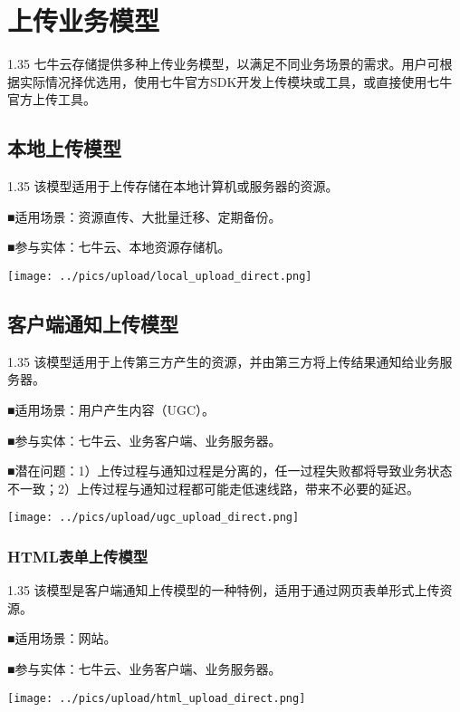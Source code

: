 \documentclass[11pt, oneside]{book}
\newcommand{\qpara}[1]{
\vspace{0.2em}
\begin{spacing}{1.35}
\noindent
#1\par
\end{spacing}
\vspace{0.2em}
}
\newcommand{\qblock}[1]{
\vspace{0.1em}
\noindent
#1\par
\vspace{0.1em}
}
\begin{document}
\chapter{上传业务模型}

\qpara{七牛云存储提供多种上传业务模型，以满足不同业务场景的需求。用户可根据实际情况择优选用，使用七牛官方SDK开发上传模块或工具，或直接使用七牛官方上传工具。}

\section{本地上传模型}

\qpara{该模型适用于上传存储在本地计算机或服务器的资源。}
\qblock{■\thinspace 适用场景：资源直传、大批量迁移、定期备份。}
\qblock{■\thinspace 参与实体：七牛云、本地资源存储机。}

\begin{center}
\texttt{[image: ../pics/upload/local\_upload\_direct.png]}
\end{center}

\clearpage

\section{客户端通知上传模型}

\qpara{该模型适用于上传第三方产生的资源，并由第三方将上传结果通知给业务服务器。}
\qblock{■\thinspace 适用场景：用户产生内容（UGC）。}
\qblock{■\thinspace 参与实体：七牛云、业务客户端、业务服务器。}
\qblock{■\thinspace 潜在问题：1）上传过程与通知过程是分离的，任一过程失败都将导致业务状态不一致；2）上传过程与通知过程都可能走低速线路，带来不必要的延迟。}

\begin{center}
\texttt{[image: ../pics/upload/ugc\_upload\_direct.png]}
\end{center}

\clearpage

\subsection{HTML表单上传模型}

\qpara{该模型是客户端通知上传模型的一种特例，适用于通过网页表单形式上传资源。}
\qblock{■\thinspace 适用场景：网站。}
\qblock{■\thinspace 参与实体：七牛云、业务客户端、业务服务器。}

\begin{center}
\texttt{[image: ../pics/upload/html\_upload\_direct.png]}
\end{center}
\end{document}
